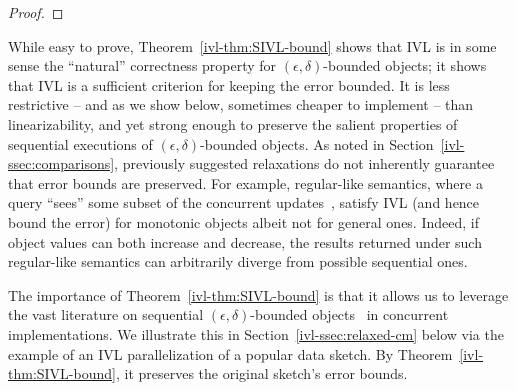 \begin{proof}

\end{proof}

While easy to prove, Theorem~\ref{ivl-thm:SIVL-bound} shows that IVL is in some sense the ``natural''
correctness property for $(\epsilon,\delta)$-bounded objects; it shows that IVL is a sufficient
criterion for keeping the error bounded. It is less restrictive -- and as we
show below, sometimes cheaper to implement -- than linearizability, and yet strong enough
to preserve the salient properties of sequential executions of $(\epsilon,\delta)$-bounded objects. As
noted in Section~\ref{ivl-ssec:comparisons}, previously suggested relaxations do not inherently guarantee that
error bounds are preserved. For example, regular-like semantics, where a query ``sees''
some subset of the concurrent updates~\cite{stylianopoulos2020delegation},  satisfy IVL (and hence bound
the error) for monotonic objects albeit not for general ones. Indeed, if object values
can both increase and decrease, the results returned under such regular-like semantics can arbitrarily diverge from possible sequential ones.

The importance of Theorem~\ref{ivl-thm:SIVL-bound} is that it allows us to leverage
the vast literature on sequential $(\epsilon, \delta)$-bounded
objects~\cite{morris1978counting, flajolet1985approximate, cichon2011approximate, liu2016one, CountMin, agarwal2013mergeable}
in concurrent implementations. We illustrate this in Section~\ref{ivl-ssec:relaxed-cm} below via the
example of an IVL parallelization of a popular data sketch. By Theorem~\ref{ivl-thm:SIVL-bound},
it preserves the original sketch's error bounds.

